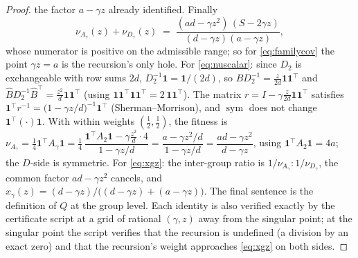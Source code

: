 \documentclass[11pt]{article}
\theoremstyle{remark}
\begin{document}
\begin{proof}
the factor $a - \gamma z$ already identified. Finally
\[
  \nu_{A_\gamma}(z) + \nu_{D_\gamma}(z)
  \;=\; \frac{(ad - \gamma z^2)\,(S - 2\gamma z)}{(d - \gamma z)(a - \gamma z)},
\]
whose numerator is positive on the admissible range; so for
\eqref{eq:familycov} the point $\gamma z = a$ is the recursion's only hole.
For \eqref{eq:nuscalar}: since $D_2$ is
exchangeable with row sums $2d$, $D_2^{-1}\mathbf{1} = \mathbf{1}/(2d)$, so
$\widehat B D_2^{-1} = \tfrac{z}{2d}\mathbf{1}\mathbf{1}^\top$ and
$\widehat B D_2^{-1} \widehat B^\top = \tfrac{z^2}{d}
\mathbf{1}\mathbf{1}^\top$ (using $\mathbf{1}\mathbf{1}^\top
\mathbf{1}\mathbf{1}^\top = 2\,\mathbf{1}\mathbf{1}^\top$). The matrix
$r = I - \gamma\tfrac{z}{2d}\mathbf{1}\mathbf{1}^\top$ satisfies
$\mathbf{1}^\top r^{-1} = \big(1 - \gamma z/d\big)^{-1}\mathbf{1}^\top$
(Sherman--Morrison), and $\operatorname{sym}$ does not change
$\mathbf{1}^\top(\cdot)\mathbf{1}$. With within weights
$(\tfrac12,\tfrac12)$, the fitness is
$\nu_{A_\gamma} = \tfrac14 \mathbf{1}^\top A_\gamma \mathbf{1}
= \tfrac14\,\dfrac{\mathbf{1}^\top A_2 \mathbf{1} - \gamma\tfrac{z^2}{d}
\cdot 4}{1 - \gamma z/d}
= \dfrac{a - \gamma z^2/d}{1 - \gamma z/d}
= \dfrac{ad - \gamma z^2}{d - \gamma z}$,
using $\mathbf{1}^\top A_2 \mathbf{1} = 4a$; the $D$-side is symmetric. For
\eqref{eq:xgz}: the inter-group ratio is $1/\nu_{A_\gamma} :
1/\nu_{D_\gamma}$, the common factor $ad - \gamma z^2$ cancels, and
$x_\gamma(z) = (d - \gamma z)/\big((d-\gamma z) + (a - \gamma z)\big)$. The
final sentence is the definition of $Q$ at the group level. Each identity
is also verified exactly by the certificate script at a grid of rational
$(\gamma, z)$ away from the singular point; at the singular point the
script verifies that the recursion is undefined (a division by an exact
zero) and that the recursion's weight approaches \eqref{eq:xgz} on both
sides.
\end{proof}
\end{document}
